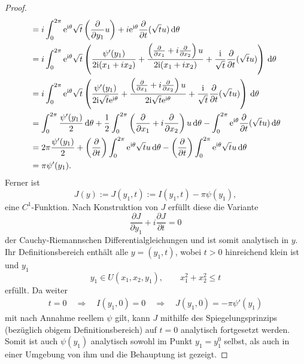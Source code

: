 \begin{proof}
\begin{align}
\begin{split}
&= i\int_{0}^{2\pi} \mathrm e^{\mathrm i\theta}\sqrt{t}\left(\frac{\partial}{\partial y_1}u\right) +i\mathrm e^{\mathrm i\theta}\frac{\partial}{\partial t}(\sqrt{t}u)\,\mathrm d\theta\\
&= i\int_{0}^{2\pi} \mathrm e^{\mathrm i\theta}\sqrt{t} \left(
	\frac{\psi'(y_1)}{2\mathrm i(x_1+ix_2)}
	+ \frac{\left(\frac{\partial}{\partial x_1} + i\frac{\partial}{\partial x_2}\right)u}{2\mathrm i(x_1+ix_2)} 
	+ \frac{\mathrm i}{\sqrt{t}} \frac{\partial}{\partial t}(\sqrt{t} u)
\right)\,\mathrm d\theta \\
&= i\int_{0}^{2\pi} \mathrm e^{\mathrm i\theta}\sqrt{t} \left( 
	\frac{\psi'(y_1)}{2\mathrm i\sqrt{t}\mathrm e^{\mathrm i\theta}} 
	+ \frac{\left(\frac{\partial}{\partial x_1} + i\frac{\partial}{\partial x_2}\right)u}{2\mathrm i\sqrt{t}\mathrm e^{\mathrm i\theta}}
	+ \frac{\mathrm i}{\sqrt{t}} \frac{\partial}{\partial t}(\sqrt{t} u)
\right)\,\mathrm d\theta	 \\
&= \int_0^{2\pi} \frac{\psi'(y_1)}{2}\,\mathrm d\theta 
	+ \frac{1}{2}\int_0^{2\pi} \left(\frac{\partial}{\partial x_1} +i\frac{\partial}{\partial x_2}\right)u\,\mathrm d\theta
	- \int_0^{2\pi} \mathrm e^{\mathrm i\theta}\frac{\partial}{\partial t}(\sqrt{t} u) \,\mathrm d\theta \\
&= 2\pi\frac{\psi'(y_1)}{2}
	+  \left(\frac{\partial}{\partial t}\right)\int_0^{2\pi} \mathrm e^{\mathrm i\theta}\sqrt{t}u\,\mathrm d\theta
	- \left(\frac{\partial}{\partial t}\right) \int_0^{2\pi} \mathrm e^{\mathrm i\theta}\sqrt{t}u\,\mathrm d\theta\\
&= \pi\psi'(y_1).
\end{split}
\end{align}
Ferner ist
\begin{equation}
J(y):=J(y_1,t):=I(y_1,t)-\pi\psi(y_1),
\end{equation}
eine $C^1$-Funktion. Nach Konstruktion von $J$ erfüllt diese die Variante
\begin{equation}
\frac{\partial J}{\partial y_1} +i\frac{\partial J}{\partial t} = 0
\end{equation}
der Cauchy-Riemannschen Differentialgleichungen und ist somit analytisch in $y$. Ihr Definitionsbereich enthält alle $y=(y_1,t)$, wobei $t>0$ hinreichend klein ist und $y_1$
\begin{equation}
y_1\in U(x_1,x_2,y_1),\qquad x_1^2+x_2^2\leq t
\end{equation}
erfüllt. Da weiter
\begin{align*}
t=0 \quad\Rightarrow\quad I(y_1,0)=0 \quad\Rightarrow\quad J(y_1,0)=-\pi\psi'(y_1)
\end{align*}
mit nach Annahme reellem $\psi$ gilt, kann $J$ mithilfe des Spiegelungsprinzips (bezüglich obigem Definitionsbereich) auf $t=0$ analytisch fortgesetzt werden. Somit ist auch $\psi(y_1)$ analytisch sowohl im Punkt $y_1=y_1^0$ selbst, als auch in einer Umgebung von ihm und die Behauptung ist gezeigt.
\end{proof}

